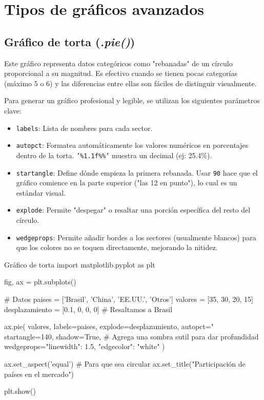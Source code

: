 \section{Tipos de gráficos avanzados}

\subsection{Gráfico de torta (\textit{.pie()})}

Este gráfico representa datos categóricos como "rebanadas" de un círculo proporcional a su magnitud. Es efectivo cuando se tienen pocas categorías (máximo 5 o 6) y las diferencias entre ellas son fáciles de distinguir visualmente.

Para generar un gráfico profesional y legible, se utilizan los siguientes parámetros clave:

\begin{itemize}
\item \texttt{labels}: Lista de nombres para cada sector.
\item \texttt{autopct}: Formatea automáticamente los valores numéricos en porcentajes dentro de la torta. \texttt{'\%1.1f\%\%'} muestra un decimal (ej: 25.4\%).
\item \texttt{startangle}: Define dónde empieza la primera rebanada. Usar \texttt{90} hace que el gráfico comience en la parte superior ("las 12 en punto"), lo cual es un estándar visual.
\item \texttt{explode}: Permite "despegar" o resaltar una porción específica del resto del círculo.
\item \texttt{wedgeprops}: Permite añadir bordes a los sectores (usualmente blancos) para que los colores no se toquen directamente, mejorando la nitidez.
\end{itemize}

\begin{pycode}{Gráfico de torta}
import matplotlib.pyplot as plt

fig, ax = plt.subplots()

# Datos 
paises = ['Brasil', 'China', 'EE.UU.', 'Otros']
valores = [35, 30, 20, 15]
desplazamiento = [0.1, 0, 0, 0] # Resaltamos a Brasil

ax.pie(
    valores,
    labels=paises,
    explode=desplazamiento,
    autopct="%
    startangle=140,
    shadow=True, # Agrega una sombra sutil para dar profundidad
    wedgeprops={"linewidth": 1.5, "edgecolor": "white"}
)

ax.set_aspect('equal') # Para que sea circular
ax.set_title("Participación de países en el mercado")

plt.show()
\end{pycode}

